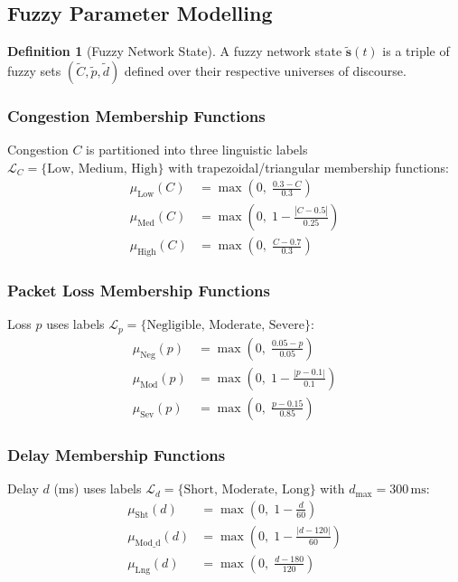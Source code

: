 \documentclass[10pt, twocolumn]{IEEEtran}
\theoremstyle{definition}
\newtheorem{definition}{Definition}
\begin{document}
\subsection{Fuzzy Parameter Modelling}

\begin{definition}[Fuzzy Network State]
A fuzzy network state $\tilde{\mathbf{s}}(t)$ is a triple of fuzzy sets $(\tilde{C}, \tilde{p}, \tilde{d})$ defined over their respective universes of discourse.
\end{definition}

\subsubsection{Congestion Membership Functions}
Congestion $C$ is partitioned into three linguistic labels $\mathcal{L}_C = \{\text{Low, Medium, High}\}$ with trapezoidal/triangular membership functions:
\begin{align}
  \mu_{\text{Low}}(C) &= \max\!\left(0,\; \frac{0.3 - C}{0.3}\right) \label{eq:muClow}\\[4pt]
  \mu_{\text{Med}}(C) &= \max\!\left(0,\; 1 - \frac{|C - 0.5|}{0.25}\right) \label{eq:muCmed}\\[4pt]
  \mu_{\text{High}}(C) &= \max\!\left(0,\; \frac{C - 0.7}{0.3}\right) \label{eq:muChigh}
\end{align}

\subsubsection{Packet Loss Membership Functions}
Loss $p$ uses labels $\mathcal{L}_p = \{\text{Negligible, Moderate, Severe}\}$:
\begin{align}
  \mu_{\text{Neg}}(p) &= \max\!\left(0,\; \frac{0.05 - p}{0.05}\right)\\[4pt]
  \mu_{\text{Mod}}(p) &= \max\!\left(0,\; 1 - \frac{|p - 0.1|}{0.1}\right)\\[4pt]
  \mu_{\text{Sev}}(p) &= \max\!\left(0,\; \frac{p - 0.15}{0.85}\right)
\end{align}

\subsubsection{Delay Membership Functions}
Delay $d$ (ms) uses labels $\mathcal{L}_d = \{\text{Short, Moderate, Long}\}$ with $d_{\max} = 300\,\text{ms}$:
\begin{align}
  \mu_{\text{Sht}}(d) &= \max\!\left(0,\; 1 - \frac{d}{60}\right)\\[4pt]
  \mu_{\text{Mod\_d}}(d) &= \max\!\left(0,\; 1 - \frac{|d - 120|}{60}\right)\\[4pt]
  \mu_{\text{Lng}}(d) &= \max\!\left(0,\; \frac{d - 180}{120}\right)
\end{align}
\end{document}
